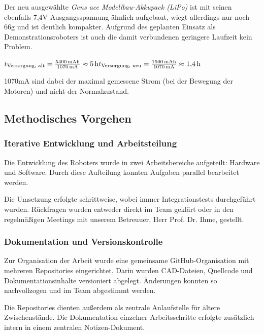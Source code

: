 Der neu ausgewählte \textit{Gens ace Modellbau-Akkupack (LiPo)} \cite{gens_ace_akku} ist mit seinen ebenfalls 7,4V Ausgangsspannung ähnlich aufgebaut, wiegt allerdings nur noch 66g und ist deutlich kompakter. Aufgrund des geplanten Einsatz als Demonstrationsroboters ist auch die damit verbundenen geringere Laufzeit kein Problem. 

$t_{\text{Versorgung, alt}} = \frac{5400\,\mathrm{mAh}}{1070\,\mathrm{mA}} \approx 5\,\mathrm{h} \newline
\newline
t_{\text{Versorgung, neu}} = \frac{1500\,\mathrm{mAh}}{1070\,\mathrm{mA}} \approx 1{,}4\,\mathrm{h}$

1070mA sind dabei der maximal gemessene Strom (bei der Bewegung der Motoren) und nicht der Normalzustand.


\subsection{Methodisches Vorgehen}

\subsubsection{Iterative Entwicklung und Arbeitsteilung}

Die Entwicklung des Roboters wurde in zwei Arbeitsbereiche aufgeteilt: Hardware und Software. Durch diese Aufteilung konnten Aufgaben parallel bearbeitet werden.

Die Umsetzung erfolgte schrittweise, wobei immer Integrationstests durchgeführt wurden. Rückfragen wurden entweder direkt im Team geklärt oder in den regelmäßigen Meetings mit unserem Betreuuer, Herr Prof. Dr. Ihme, gestellt. 

\subsubsection{Dokumentation und Versionskontrolle}

Zur Organisation der Arbeit wurde eine gemeinsame GitHub-Organisation mit mehreren Repositories eingerichtet. Darin wurden CAD-Dateien, Quellcode und Dokumentationsinhalte versioniert abgelegt. Änderungen konnten so nachvollzogen und im Team abgestimmt werden.

Die Repositories dienten außerdem als zentrale Anlaufstelle für ältere Zwischenstände. Die Dokumentation einzelner Arbeitsschritte erfolgte zusätzlich intern in einem zentralen Notizen-Dokument.
